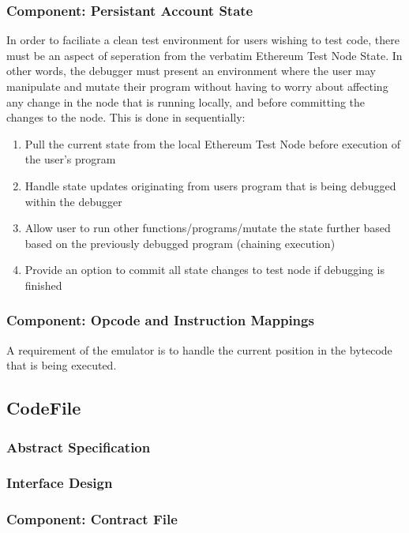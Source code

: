 \documentclass{report}
\begin{document}

    \subsubsection{Component: Persistant Account State}
        In order to faciliate a clean test environment for users wishing to test code, there must be an aspect of seperation from the verbatim Ethereum Test Node State. In other words, the debugger must present an environment where the user may manipulate and mutate their program without having to worry about affecting any change in the node that is running locally, and before committing the changes to the node. This is done in sequentially:
        \begin{enumerate}
            \item Pull the current state from the local Ethereum Test Node before execution of the user's program
            \item Handle state updates originating from users program that is being debugged within the debugger
            \item Allow user to run other functions/programs/mutate the state further based based on the previously debugged program (chaining execution)
            \item Provide an option to commit all state changes to test node if debugging is finished
        \end{enumerate}

    \subsubsection{Component: Opcode and Instruction Mappings}
        A requirement of the emulator is to handle the current position in the bytecode that is being executed.

\subsection{CodeFile}
    \subsubsection{Abstract Specification}
    \subsubsection{Interface Design}
    \subsubsection{Component: Contract File}
\end{document}
